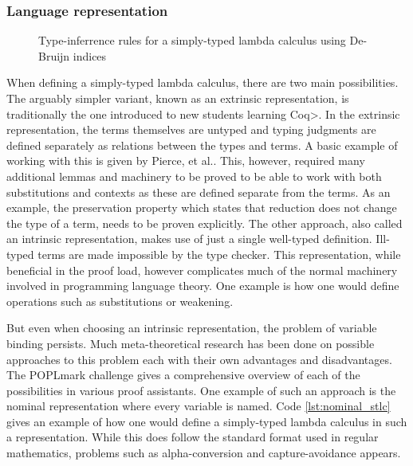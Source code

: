 \subsubsection{Language representation}
\label{sec:language_repr}

\begin{figure}
  \label{fig:stlc_infer}
  \caption{Type-inferrence rules for a simply-typed lambda calculus using De-Bruijn indices}
\end{figure}

When defining a simply-typed lambda calculus, there are two main possibilities\cite{plfa2019}.
The arguably simpler variant, known as an extrinsic representation, is traditionally the one introduced to new students learning \<Coq>.
In the extrinsic representation, the terms themselves are untyped and typing judgments are defined separately as relations between the types and terms. A basic example of working with this is given by Pierce, et al.\cite{Pierce:SF2}.
This, however, required many additional lemmas and machinery to be proved to be able to work with both substitutions and contexts as these are defined separate from the terms.
As an example, the preservation property which states that reduction does not change the type of a term, needs to be proven explicitly.
The other approach, also called an intrinsic representation, makes use of just a single well-typed definition.
Ill-typed terms are made impossible by the type checker.
This representation, while beneficial in the proof load, however complicates much of the normal machinery involved in programming language theory.
One example is how one would define operations such as substitutions or weakening.

But even when choosing an intrinsic representation, the problem of variable binding persists.
Much meta-theoretical research has been done on possible approaches to this problem each with their own advantages and disadvantages.
The POPLmark challenge gives a comprehensive overview of each of the possibilities in various proof assistants\cite{Aydemir2005}.
One example of such an approach is the nominal representation where every variable is named.
Code \cref{lst:nominal_stlc} gives an example of how one would define a simply-typed lambda calculus in such a representation.
While this does follow the standard format used in regular mathematics, problems such as alpha-conversion and capture-avoidance appears.

